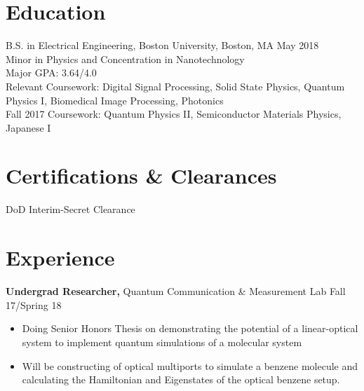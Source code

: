 \documentclass[margin]{res}
\begin{document}
 
 
\address{{\bf Present Address} \\ 39 Buswell St Apt 08 \\ Boston, MA 02215  \\
        (781) 664-7151 \\ Linkedin - http://tinyurl.com/pptgrym }
        
\address{{\bf Permanent Address} \\ 9350 Double R Blvd Apt 3814 \\ Reno, NV 89521 \\
        sonamg@bu.edu }


\begin{resume} 
 

\section{Education} 
B.S. in Electrical Engineering, Boston University, Boston, MA \hfill May 2018 \\
Minor in Physics and Concentration in Nanotechnology \\
Major GPA: 3.64/4.0 \\
Relevant Coursework: Digital Signal Processing, Solid State Physics, Quantum Physics I, Biomedical Image Processing, Photonics \\
Fall 2017 Coursework: Quantum Physics II, Semiconductor Materials Physics, Japanese I
 
\section{Certifications \& Clearances}
DoD Interim-Secret Clearance 

\section{Experience}
{\bf Undergrad Researcher,} Quantum Communication \& Measurement Lab \hfill  Fall 17/Spring 18
\begin{itemize}  pt
\item Doing Senior Honors Thesis on demonstrating the potential of a linear-optical system to implement quantum simulations of a molecular system
\item Will be constructing of optical multiports to simulate a benzene molecule and calculating the Hamiltonian and Eigenstates of the optical benzene setup.
\end{itemize}




\end{resume}
\end{document}

